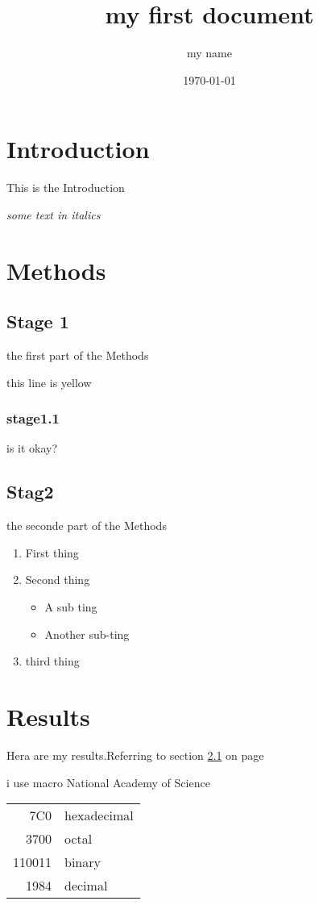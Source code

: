 \documentclass[a4paper,12pt]{article}
\begin{document}
\title{my first document}
\author{my name}
\date{\today}
\maketitle

\tableofcontents


\section{Introduction}
This is the Introduction

\textit{some text in italics}
\section{Methods}
\subsection{Stage 1}
\label{sec1}
the first part of the Methods

{\color{red}this line is yellow}
\subsubsection{stage1.1}
is it okay?
\subsection{Stag2 }
the seconde part of the Methods

\begin{enumerate}
	\item First thing
	\item Second thing
	\begin{itemize}
		\item A sub ting
		\item Another sub-ting
	\end{itemize}
	\item third thing
\end{enumerate}
\section{Results}
Hera are my results.Referring to section \ref{sec1} on page \pageref{sec1}


\def \NAS {National Academy of Science}

i use macro \NAS


\begin{tabular}{|r|l|}
\hline
7C0 & hexadecimal\\
3700 & octal\\
110011 & binary\\
\hline
1984 & decimal\\
\hline
\end{tabular}
\end{document}

